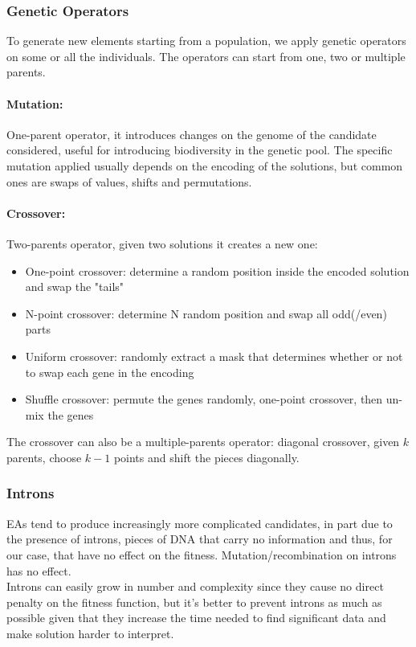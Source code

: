 \subsubsection{Genetic Operators}
To generate new elements starting from a population, we apply genetic operators on some or all the individuals. The operators can start from one, two or multiple parents.\\

\paragraph{Mutation:} One-parent operator, it introduces changes on the genome of the candidate considered, useful for introducing biodiversity in the genetic pool. The specific mutation applied usually depends on the encoding of the solutions, but common ones are swaps of values, shifts and permutations.\\

\paragraph{Crossover:} Two-parents operator, given two solutions it creates a new one: 
\begin{itemize}
	\item One-point crossover: determine a random position inside the encoded solution and swap the "tails"
	\item N-point crossover: determine N random position and swap all odd(/even) parts
	\item Uniform crossover: randomly extract a mask that determines whether or not to swap each gene in the encoding
	\item Shuffle crossover: permute the genes randomly, one-point crossover, then un-mix the genes
\end{itemize}

The crossover can also be a multiple-parents operator: diagonal crossover, given $k$ parents, choose $k-1$ points and shift the pieces diagonally.\\

\subsubsection{Introns}
EAs tend to produce increasingly more complicated candidates, in part due to the presence of introns, pieces of DNA that carry no information and thus, for our case, that have no effect on the fitness. Mutation/recombination on introns has no effect.\\
Introns can easily grow in number and complexity since they cause no direct penalty on the fitness function, but it's better to prevent introns as much as possible given that they increase the time needed to find significant data and make solution harder to interpret.\\

